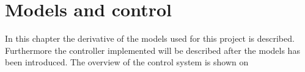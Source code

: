 \chapter{Models and control}
In this chapter the derivative of the models used for this project is described. Furthermore the controller implemented will be described after the models has been introduced. The overview of the control system is shown on  






